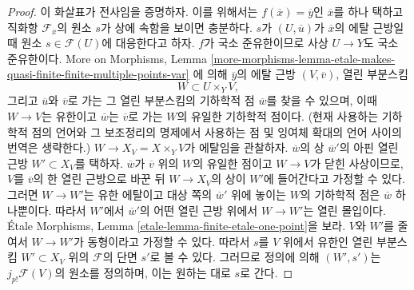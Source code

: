 \begin{proof}
\medskip\noindent
이 화살표가 전사임을 증명하자. 이를 위해서는
$f(\overline{x}) = \overline{y}$인 $\overline{x}$를 하나 택하고
직화항 $\mathcal{F}_{\overline{x}}$의 원소 $s$가 상에 속함을 보이면
충분하다. $s$가 $(U, \overline{u})$가 $\overline{x}$의 에탈 근방일 때
원소 $s \in \mathcal{F}(U)$에 대응한다고 하자. $f$가 국소
준유한이므로 사상 $U \to Y$도 국소 준유한이다. More on Morphisms,
Lemma
\ref{more-morphisms-lemma-etale-makes-quasi-finite-finite-multiple-points-var}
에 의해 $\overline{y}$의 에탈 근방 $(V, \overline{v})$, 열린 부분스킴
$$
W \subset U \times_Y V,
$$
그리고 $\overline{u}$와 $\overline{v}$로 가는 그 열린 부분스킴의 기하학적 점
$\overline{w}$를 찾을 수 있으며, 이때 $W \to V$는 유한이고
$\overline{w}$는 $\overline{v}$로 가는 $W$의 유일한 기하학적 점이다.
(현재 사용하는 기하학적 점의 언어와 그 보조정리의 명제에서 사용하는
점 및 잉여체 확대의 언어 사이의 번역은 생략한다.)
$W \to X_V = X \times_Y V$가 에탈임을 관찰하자.
$\overline{w}$의 상 $\overline{w}'$의 아핀 열린 근방
$W' \subset X_V$를 택하자. $\overline{w}$가 $\overline{v}$ 위의
$W$의 유일한 점이고 $W \to V$가 닫힌 사상이므로, $V$를
$\overline{v}$의 한 열린 근방으로 바꾼 뒤 $W \to X_V$의 상이
$W'$에 들어간다고 가정할 수 있다. 그러면 $W \to W'$는 유한
에탈이고 대상 쪽의 $\overline{w}'$ 위에 놓이는 $W$의 기하학적 점은
$\overline{w}$ 하나뿐이다. 따라서 $W'$에서 $\overline{w}'$의
어떤 열린 근방 위에서 $W \to W'$는 열린 몰입이다.
\'Etale Morphisms, Lemma
\ref{etale-lemma-finite-etale-one-point}을 보라. $V$와 $W'$를
줄여서 $W \to W'$가 동형이라고 가정할 수 있다. 따라서 $s$를
$V$ 위에서 유한인 열린 부분스킴 $W' \subset X_V$ 위의
$\mathcal{F}$의 단면 $s'$로 볼 수 있다.
그러므로 정의에 의해 $(W', s')$는 $j_{p!}\mathcal{F}(V)$의 원소를
정의하며, 이는 원하는 대로 $s$로 간다.


\end{proof}
